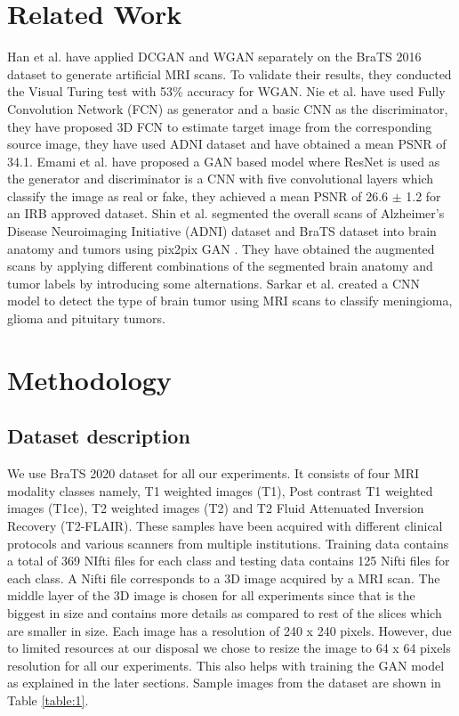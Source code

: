 \documentclass[10pt,journal,compsoc]{IEEEtran}
\begin{document}
\section{Related Work}

Han et al. \cite{Han2018} have applied DCGAN and WGAN separately on the BraTS 2016 dataset to generate artificial MRI scans. To validate their results, they conducted the
Visual Turing test with 53\% accuracy for WGAN. Nie et al. \cite{Nie2018} have used Fully Convolution Network (FCN) as generator and a basic CNN as the discriminator,
they have proposed 3D FCN to estimate target image from the corresponding source image, they have used ADNI dataset and have obtained a mean PSNR of 34.1. Emami et al.
\cite{Emami2018} have proposed a GAN based model where ResNet is used as the generator and discriminator is a CNN with five convolutional layers which classify the image
as real or fake, they achieved a mean PSNR of 26.6 $\pm$ 1.2 for an IRB approved dataset. Shin et al. \cite{Shin2016} segmented the overall scans of Alzheimer's Disease
Neuroimaging Initiative (ADNI) \cite{Petersen2009} dataset and BraTS dataset into brain anatomy and tumors using pix2pix GAN \cite{Isola2016}. They have obtained the augmented scans by applying different combinations of the segmented brain anatomy and tumor labels by introducing some alternations. Sarkar et al. \cite{Sarkar2020} created
a CNN model to detect the type of brain tumor using MRI scans to classify meningioma, glioma and pituitary tumors.

\section{Methodology}

\subsection{Dataset description}

We use BraTS 2020 dataset for all our experiments. It consists of four MRI modality classes namely, T1 weighted images (T1), Post contrast T1 weighted images (T1ce),
T2 weighted images (T2) and T2 Fluid Attenuated Inversion Recovery (T2-FLAIR). These samples have been acquired with different clinical protocols and various scanners
from multiple institutions. Training data contains a total of 369 NIfti files for each class and testing data contains 125 Nifti files for each class. A Nifti file
corresponds to a 3D image acquired by a MRI scan. The middle layer of the 3D image is chosen for all experiments since that is the biggest in size and contains more
details as compared to rest of the slices which are smaller in size. Each image has a resolution of 240 x 240 pixels. However, due to limited resources at our disposal
we chose to resize the image to 64 x 64 pixels resolution for all our experiments. This also helps with training the GAN model as explained in the later sections.
Sample images from the dataset are shown in Table \ref{table:1}.
\end{document}
